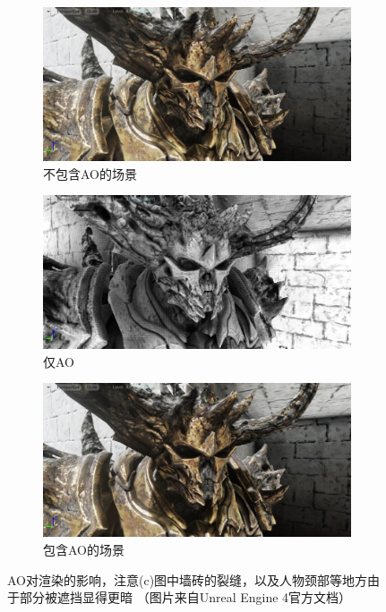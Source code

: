 \begin{figure}
\begin{fullwidth}
	\begin{subfigure}[b]{0.325\thewidth}
		\includegraphics[width=1.\textwidth]{figures/intro/ao-1}
		\caption{不包含AO的场景}
	\end{subfigure}
	\begin{subfigure}[b]{0.325\thewidth}
		\includegraphics[width=1.\textwidth]{figures/intro/ao-2}
		\caption{仅AO}
	\end{subfigure}
	\begin{subfigure}[b]{0.325\thewidth}
		\includegraphics[width=1.\textwidth]{figures/intro/ao-3}
		\caption{包含AO的场景}
	\end{subfigure}
\caption{AO对渲染的影响，注意(c)图中墙砖的裂缝，以及人物颈部等地方由于部分被遮挡显得更暗 （图片来自Unreal Engine 4官方文档）}
\label{f:intro-ao}
\end{fullwidth}
\end{figure}



